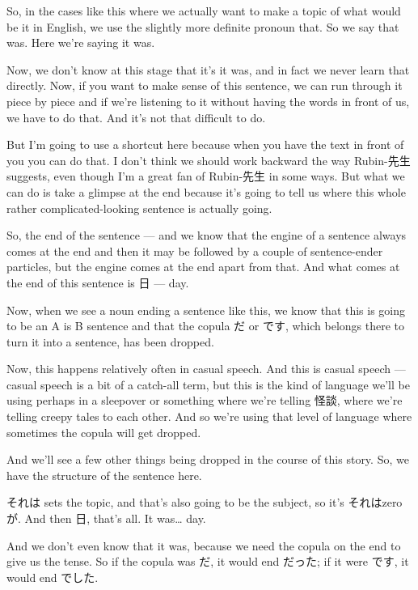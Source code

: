 So, in the cases like this where we actually want to make a topic of what would be it in English, we use the slightly more definite pronoun that. So we say that was. Here we're saying it was.

Now, we don't know at this stage that it's it was, and in fact we never learn that directly. Now, if you want to make sense of this sentence, we can run through it piece by piece and if we're listening to it without having the words in front of us, we have to do that. And it's not that difficult to do.

But I'm going to use a shortcut here because when you have the text in front of you you can do that. I don't think we should work backward the way Rubin-先生 suggests, even though I'm a great fan of Rubin-先生 in some ways. But what we can do is take a glimpse at the end because it's going to tell us where this whole rather complicated-looking sentence is actually going.

So, the end of the sentence --- and we know that the engine of a sentence always comes at the end and then it may be followed by a couple of sentence-ender particles, but the engine comes at the end apart from that. And what comes at the end of this sentence is 日 --- day.

Now, when we see a noun ending a sentence like this, we know that this is going to be an\crlf
A is B sentence and that the copula だ or です, which belongs there to turn it into a sentence, has been dropped.

Now, this happens relatively often in casual speech. And this is casual speech --- casual speech is a bit of a catch-all term, but this is the kind of language we'll be using perhaps in a sleepover or something where we're telling 怪談, where we're telling creepy tales to each other. And so we're using that level of language where sometimes the copula will get dropped.

And we'll see a few other things being dropped in the course of this story. So, we have the structure of the sentence here.

それは sets the topic, and that's also going to be the subject, so it's それはzeroが. And then 日, that's all. It was\ldots{} day.

{}

And we don't even know that it was, because we need the copula on the end to give us the tense. So if the copula was だ, it would end だった; if it were です, it would end でした.

